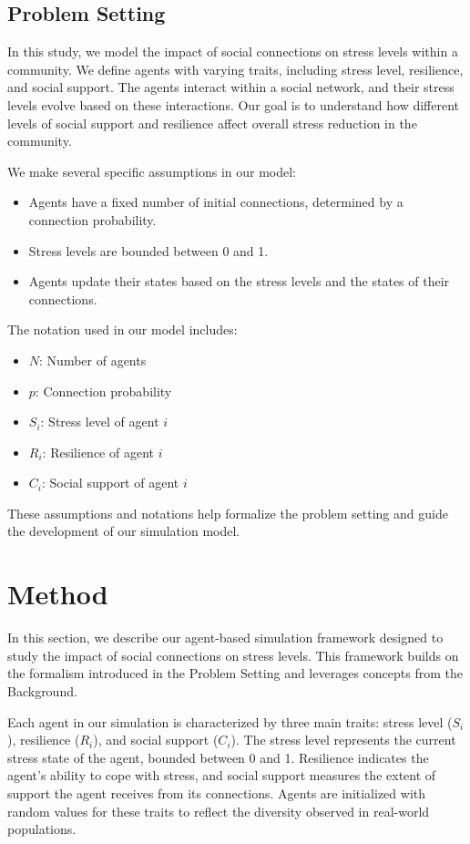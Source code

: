 \documentclass{article} %
\begin{document}
\subsection{Problem Setting}
In this study, we model the impact of social connections on stress levels within a community. We define agents with varying traits, including stress level, resilience, and social support. The agents interact within a social network, and their stress levels evolve based on these interactions. Our goal is to understand how different levels of social support and resilience affect overall stress reduction in the community.

We make several specific assumptions in our model:
\begin{itemize}
    \item Agents have a fixed number of initial connections, determined by a connection probability.
    \item Stress levels are bounded between 0 and 1.
    \item Agents update their states based on the stress levels and the states of their connections.
\end{itemize}
The notation used in our model includes:
\begin{itemize}
    \item $N$: Number of agents
    \item $p$: Connection probability
    \item $S_i$: Stress level of agent $i$
    \item $R_i$: Resilience of agent $i$
    \item $C_i$: Social support of agent $i$
\end{itemize}
These assumptions and notations help formalize the problem setting and guide the development of our simulation model.

\section{Method}
\label{sec:method}

In this section, we describe our agent-based simulation framework designed to study the impact of social connections on stress levels. This framework builds on the formalism introduced in the Problem Setting and leverages concepts from the Background.

Each agent in our simulation is characterized by three main traits: stress level ($S_i$), resilience ($R_i$), and social support ($C_i$). The stress level represents the current stress state of the agent, bounded between 0 and 1. Resilience indicates the agent's ability to cope with stress, and social support measures the extent of support the agent receives from its connections. Agents are initialized with random values for these traits to reflect the diversity observed in real-world populations.
\end{document}
